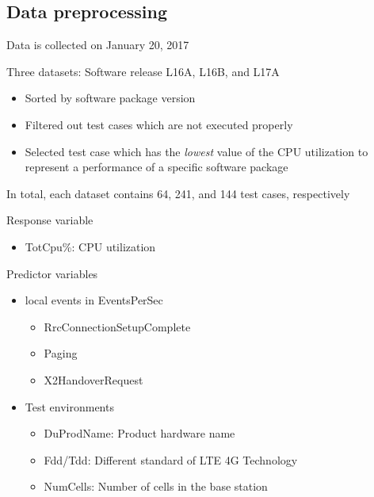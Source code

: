 \documentclass{beamer}
\begin{document}
\subsection{Data preprocessing}
\begin{frame}
Data is collected on January 20, 2017

Three datasets: Software release L16A, L16B, and L17A
\begin{itemize}
	\item Sorted by software package version
	\item Filtered out test cases which are not executed properly
	\item Selected test case which has the \textit{lowest} value of the CPU utilization to represent a performance of a specific software package
\end{itemize}

In total, each dataset contains 64, 241, and 144 test cases, respectively

\end{frame}

%

\begin{frame}
Response variable 
\begin{itemize}
	\item TotCpu\%: CPU utilization
\end{itemize}	
\vspace{1em}
Predictor variables
\begin{itemize}
	\item local events in EventsPerSec
	\begin{itemize}
		\item RrcConnectionSetupComplete
		\item Paging
		\item X2HandoverRequest
	\end{itemize}	
	\item Test environments
	\begin{itemize}
		\item DuProdName: Product hardware name
		\item Fdd/Tdd: Different standard of LTE 4G Technology
		\item NumCells: Number of cells in the base station
	\end{itemize}
\end{itemize}

\end{frame}
\end{document}
